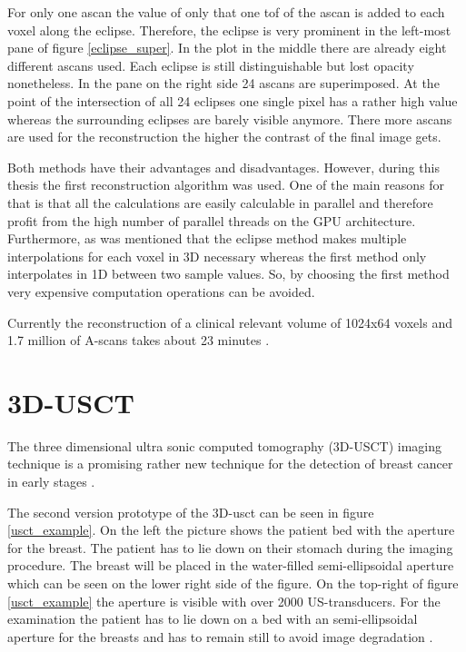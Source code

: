 For only one \ac{ascan} the value of only that one \ac{tof} of the \ac{ascan} is added to each voxel along the eclipse. Therefore, the eclipse is very prominent in the left-most pane of figure \ref{eclipse_super}. In the plot in the middle there are already eight different \acp{ascan} used. Each eclipse is still distinguishable but lost opacity nonetheless.
In the pane on the right side 24 \acp{ascan} are superimposed. At the point of the intersection of all 24 eclipses one single pixel has a rather high value whereas the surrounding eclipses are barely visible anymore. There more \acp{ascan} are used for the reconstruction the higher the contrast of the final image gets.

\bigskip

Both methods have their advantages and disadvantages. However, during this thesis the first reconstruction algorithm was used. One of the main reasons for that is that all the calculations are easily calculable in parallel and therefore profit from the high number of parallel threads on the GPU architecture. Furthermore, as was mentioned that the eclipse method makes multiple interpolations for each voxel in 3D necessary whereas the first method only interpolates in 1D between two sample values. So, by choosing the first method very expensive computation operations can be avoided.


Currently the reconstruction of a clinical relevant volume of 1024x64 voxels and 1.7 million of A-scans takes about 23 minutes \cite{Kretzek2014GPUAberration}.






\section{3D-USCT}

The three dimensional ultra sonic computed tomography (3D-USCT) imaging technique is a promising rather new technique for the detection of breast cancer in early stages \cite{Ruiter2011RealizationUSCT}.

The second version prototype of the 3D-\ac{usct} can be seen in figure \ref{usct_example}. On the left the picture shows the patient bed with the aperture for the breast. The patient has to lie down on their stomach during the imaging procedure. The breast will be placed in the water-filled semi-ellipsoidal aperture which can be seen on the lower right side of the figure. On the top-right of figure \ref{usct_example} the aperture is visible with over 2000 US-transducers.
For the examination the patient has to lie down on a bed with an semi-ellipsoidal aperture for the breasts and has to remain still to avoid image degradation \cite{Ruiter2011RealizationUSCT}. 

